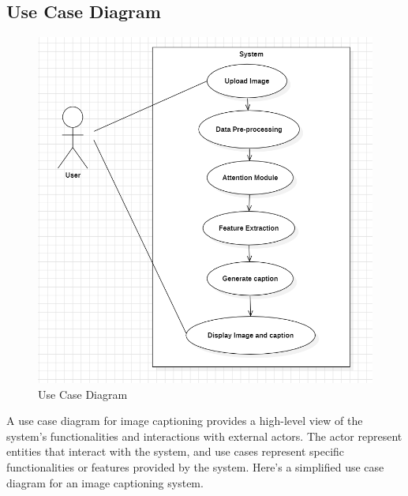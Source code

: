 \documentclass[oneside,a4paper,12pt]{report}
\begin{document}
\subsection{Use Case Diagram}
\begin{figure}[H]
\begin{center}
\includegraphics[width=1.0\linewidth]{us1}
\caption{Use Case Diagram}

\label{Fig:f4}
\end{center}
\end{figure}

A use case diagram for image captioning provides a high-level view of the system's functionalities and interactions with external actors. The actor represent entities that interact with the system, and use cases represent specific functionalities or features provided by the system. Here's a simplified use case diagram for an image captioning system.\cite{r6}
\end{document}
